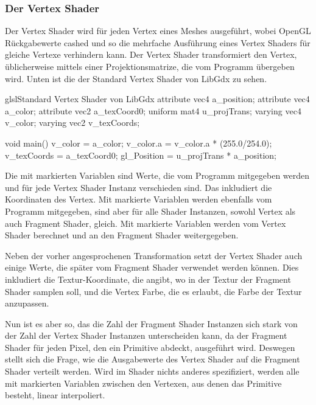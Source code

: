 \subsubsection{Der Vertex Shader}

Der Vertex Shader wird für jeden Vertex eines Meshes ausgeführt, wobei OpenGL Rückgabewerte cashed und so die mehrfache
Ausführung eines Vertex Shaders für gleiche Vertexe verhindern kann.
Der Vertex Shader transformiert den Vertex, üblicherweise mittels einer Projektionsmatrize, die vom Programm übergeben
wird.
Unten ist die der Standard Vertex Shader von LibGdx zu sehen.

\begin{codeBlock}{glsl}{Standard Vertex Shader von LibGdx}
attribute vec4 a_position;
attribute vec4 a_color;
attribute vec2 a_texCoord0;
uniform mat4 u_projTrans;
varying vec4 v_color;
varying vec2 v_texCoords;

void main() {
    v_color = a_color;
    v_color.a = v_color.a * (255.0/254.0);
    v_texCoords = a_texCoord0;
    gl_Position = u_projTrans * a_position;
}
\end{codeBlock}

Die mit  markierten Variablen sind Werte, die vom Programm mitgegeben werden und für jede
Vertex Shader Instanz verschieden sind.
Das inkludiert \zB die Koordinaten des Vertex.
Mit  markierte Variablen werden ebenfalls vom Programm mitgegeben, sind aber für alle Shader Instanzen,
sowohl Vertex als auch Fragment Shader, gleich.
Mit  markierte Variablen werden vom Vertex Shader berechnet und an den Fragment Shader weitergegeben.

Neben der vorher angesprochenen Transformation setzt der Vertex Shader auch einige Werte, die später vom Fragment
Shader verwendet werden können.
Dies inkludiert die Textur-Koordinate, die angibt, wo in der Textur der Fragment Shader samplen soll, und die Vertex
Farbe, die es erlaubt, die Farbe der Textur anzupassen.

Nun ist es aber so, das die Zahl der Fragment Shader Instanzen sich stark von der Zahl der Vertex Shader Instanzen
unterscheiden kann, da der Fragment Shader für jeden Pixel, den ein Primitive abdeckt, ausgeführt wird.
Deswegen stellt sich die Frage, wie die Ausgabewerte des Vertex Shader auf die Fragment Shader verteilt werden.
Wird im Shader nichts anderes spezifiziert, werden alle mit  markierten Variablen zwischen den
Vertexen, aus denen das Primitive besteht, linear interpoliert.\cite{openglVertexShader, openglTypeQualifiers}

